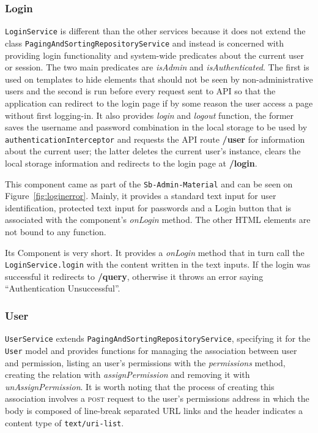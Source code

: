 \subsubsection{Login}
\texttt{LoginService} is different than the other services because it does not extend the class \texttt{PagingAndSortingRepositoryService} and instead is concerned with providing login functionality and system-wide predicates about the current user or session. The two main predicates are \textit{isAdmin} and \textit{isAuthenticated}. The first is used on templates to hide elements that should not be seen by non-administrative users and the second is run before every request sent to \gls{API} so that the application can redirect to the login page if by some reason the user access a page without first logging-in. It also provides \textit{login} and \textit{logout} function, the former saves the username and password combination in the local storage to be used by \texttt{authenticationInterceptor} and requests the \gls{API} route \textbf{/user} for information about the current user; the latter deletes the current user's instance, clears the local storage information and redirects to the login page at \textbf{/login}.

This component came as part of the \texttt{Sb-Admin-Material} and can be seen on Figure~\ref{fig:loginerror}. Mainly, it provides a standard text input for user identification, protected text input for passwords and a Login button that is associated with the component's \textit{onLogin} method. The other \gls{HTML} elements are not bound to any function.

Its Component is very short. It provides a \textit{onLogin} method that in turn call the \texttt{LoginService.login} with the content written in the text inputs. If the login was successful it redirects to \textbf{/query}, otherwise it throws an error saying ``Authentication Unsuccessful''.

\subsubsection{User}
\texttt{UserService} extends \texttt{PagingAndSortingRepositoryService}, specifying it for the \texttt{User} model and provides functions for managing the association between user and permission, listing an user's permissions with the \textit{permissions} method, creating the relation with \textit{assignPermission} and removing it with \textit{unAssignPermission}. It is worth noting that the process of creating this association involves a \textsc{post} request to the user's permissions address in which the body is composed of line-break separated \gls{URL} links and the header indicates a content type of \texttt{text/uri-list}.

